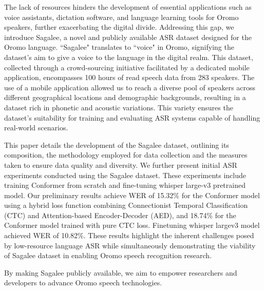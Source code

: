 \documentclass[conference, 9pt]{IEEEtran}
\begin{document}
The lack of resources hinders the development of essential applications such as voice assistants, dictation software, and language learning tools for Oromo speakers, further exacerbating the digital divide.
Addressing this gap, we introduce Sagalee, a novel and publicly available ASR dataset designed for the Oromo language. ``Sagalee" translates to ``voice" in Oromo, signifying the dataset's aim to give a voice to the language in the digital realm. This dataset, collected through a crowd-sourcing initiative facilitated by a dedicated mobile application, encompasses 100 hours of read speech data from 283 speakers. The use of a mobile application allowed us to reach a diverse pool of speakers across different geographical locations and demographic backgrounds, resulting in a dataset rich in phonetic and acoustic variations. This variety ensures the dataset's suitability for training and evaluating ASR systems capable of handling real-world scenarios.

This paper details the development of the Sagalee dataset, outlining its composition, the methodology employed for data collection and the measures taken to ensure data quality and diversity. We further present initial ASR experiments conducted using the Sagalee dataset. These experiments include training Conformer \cite{gulati2020conformer} from scratch and fine-tuning whisper \cite{radford2022whisper} large-v3 pretrained model. Our preliminary results achieve WER of 15.32\% for the Conformer model using a hybrid loss function combining Connectionist Temporal Classification (CTC) and Attention-based Encoder-Decoder (AED), and 18.74\% for the Conformer model trained with pure CTC loss. Finetuning whisper largev3 model achieved WER of 10.82\%. These results highlight the inherent challenges posed by low-resource language ASR while simultaneously demonstrating the viability of Sagalee dataset in enabling Oromo speech recognition research.


By making Sagalee publicly available, we aim to empower researchers and developers to advance Oromo speech technologies.
\end{document}
